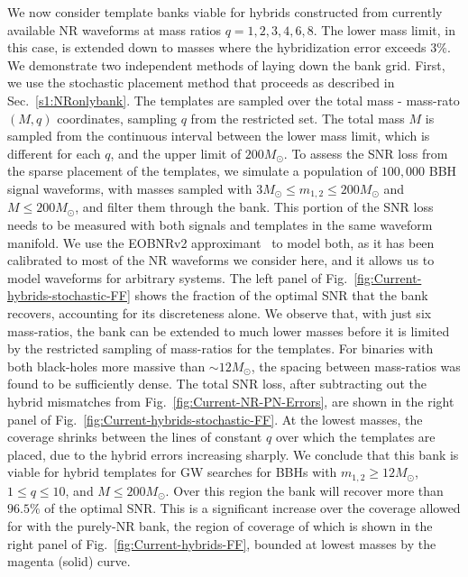 We now consider template banks viable for hybrids constructed from currently 
available NR waveforms at mass ratios $q=1,2,3,4,6,8$. The lower mass limit,
in this case, is extended down to masses where the hybridization error 
exceeds $3\%$. We demonstrate two independent methods of laying
down the bank grid. First, we use the stochastic placement method that proceeds
as described in Sec.~\ref{s1:NRonlybank}. The templates are sampled over the
total mass - mass-rato $(M,q)$ coordinates, sampling $q$ from the restricted
set. The total mass $M$ is sampled from the continuous interval between the 
lower mass limit, which is different for each $q$, and the upper limit of
$200M_\odot$. To assess the SNR loss from the sparse placement
of the templates, we simulate a population of $100,000$ BBH signal waveforms,
with masses sampled with $3M_\odot\leq m_{1,2}\leq 200M_\odot$ and 
$M\leq 200M_\odot$, and filter them through the bank. This portion of the SNR
loss needs to be measured with both signals and templates in the same waveform
manifold. We use the EOBNRv2 approximant~\cite{BuonannoEOBv2Main} to model both, 
as it has been calibrated to most of the NR waveforms we consider here, and it
allows us to model waveforms for arbitrary systems. The left panel of
Fig.~\ref{fig:Current-hybrids-stochastic-FF} shows the
fraction of the optimal SNR that the bank recovers, accounting for its 
discreteness alone. We observe that, with just six mass-ratios, the bank 
can be extended to much lower masses before it is limited by the restricted
sampling of mass-ratios for the templates. For binaries with both black-holes 
more massive than $\sim 12M_\odot$, the spacing between mass-ratios was found 
to be sufficiently dense. The total SNR loss, after subtracting out 
the hybrid mismatches from Fig.~\ref{fig:Current-NR-PN-Errors}, are shown in 
the right panel of Fig.~\ref{fig:Current-hybrids-stochastic-FF}. 
At the lowest masses, the coverage shrinks between the lines of constant $q$ 
over which the templates are placed, due to the hybrid errors increasing 
sharply. We conclude that this bank is viable for hybrid templates for GW 
searches for BBHs with $m_{1,2}\geq 12M_\odot$, $1\leq q\leq 10$, and 
$M\leq 200M_\odot$. Over this region the bank will recover more than $96.5\%$
of the optimal SNR. This is a significant increase over the coverage allowed 
for with the purely-NR bank, the region of coverage of which is shown in the 
right panel of Fig.~\ref{fig:Current-hybrids-FF}, bounded at lowest masses by 
the magenta (solid) curve.


